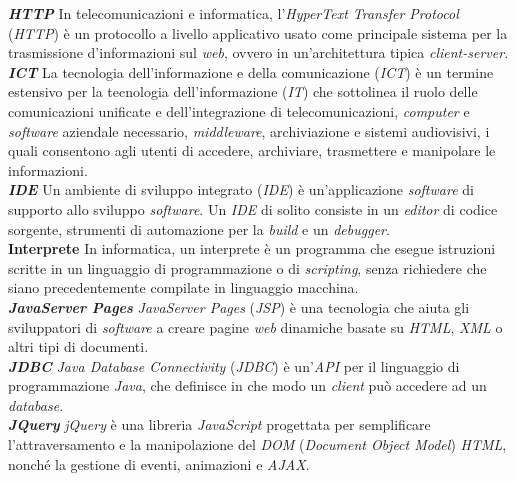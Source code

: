 \textbf{\textit{HTTP}} In telecomunicazioni e informatica, l'\textit{HyperText Transfer Protocol} (\textit{HTTP}) è un protocollo a livello applicativo usato come principale sistema per la trasmissione d'informazioni sul \textit{web}, ovvero in un'architettura tipica \textit{client-server}.\\

\textbf{\textit{ICT}} La tecnologia dell'informazione e della comunicazione (\textit{ICT}) è un termine estensivo per la tecnologia dell'informazione (\textit{IT}) che sottolinea il ruolo delle comunicazioni unificate e dell'integrazione di telecomunicazioni, \textit{computer} e \textit{software} aziendale necessario, \textit{middleware}, archiviazione e sistemi audiovisivi, i quali consentono agli utenti di accedere, archiviare, trasmettere e manipolare le informazioni.\\

\textbf{\textit{IDE}} Un ambiente di sviluppo integrato (\textit{IDE}) è un'applicazione \textit{software} di supporto allo sviluppo \textit{software}. Un \textit{IDE} di solito consiste in un \textit{editor} di codice sorgente, strumenti di automazione per la \textit{build} e un \textit{debugger}.\\

\textbf{Interprete} In informatica, un interprete è un programma che esegue istruzioni scritte in un linguaggio di programmazione o di \textit{scripting}, senza richiedere che siano precedentemente compilate in linguaggio macchina.\\

\textbf{\textit{JavaServer Pages}} \textit{JavaServer Pages} (\textit{JSP}) è una tecnologia che aiuta gli sviluppatori di \textit{software} a creare pagine \textit{web} dinamiche basate su \textit{HTML}, \textit{XML} o altri tipi di documenti.\\

\textbf{\textit{JDBC}} \textit{Java Database Connectivity} (\textit{JDBC}) è un'\textit{API} per il linguaggio di programmazione \textit{Java}, che definisce in che modo un \textit{client} può accedere ad un \textit{database}.\\

\textbf{\textit{JQuery}} \textit{jQuery} è una libreria \textit{JavaScript} progettata per semplificare l'attraversamento e la manipolazione del \textit{DOM} (\textit{Document Object Model}) \textit{HTML}, nonché la gestione di eventi, animazioni e \textit{AJAX}.\\

